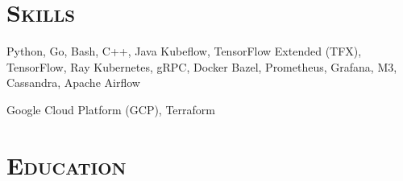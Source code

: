 \documentclass[alternative,10pt,compact]{yaac-another-awesome-cv}
\newcommand\sectionHeader[1]{\section{\texorpdfstring{\color{accentcolor}\textsc{#1}}{#1}}}
\begin{document}
\sectionHeader{Skills}

\begin{keywords}
  {
    Python,
    Go,
    Bash,
    C++,
    Java
  }
  {
    Kubeflow,
    TensorFlow Extended (TFX),
    TensorFlow,
    Ray
  }
  {
    Kubernetes,
    gRPC,
    Docker
  }
  {
    Bazel,
    Prometheus,
    Grafana,
    M3,
    Cassandra,
    Apache Airflow
  }

  {
    Google Cloud Platform (GCP),
    Terraform
  }
\end{keywords}

\sectionHeader{Education}

\begin{scholarship}
\end{scholarship}
\end{document}
